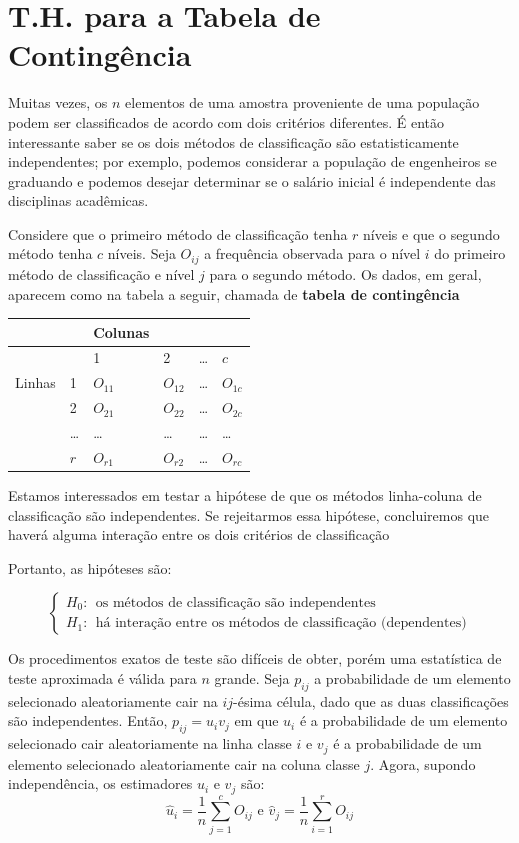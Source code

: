 \documentclass[
]{book}
\begin{document}
\hypertarget{t.h.-para-a-tabela-de-continguxeancia}{%
\section{T.H. para a Tabela de Contingência}\label{t.h.-para-a-tabela-de-continguxeancia}}

Muitas vezes, os \(n\) elementos de uma amostra proveniente de uma população podem ser classificados de acordo com dois critérios diferentes. É então interessante saber se os dois métodos de classificação são estatisticamente independentes; por exemplo, podemos considerar a população de engenheiros se graduando e podemos desejar determinar se o salário inicial é independente das disciplinas acadêmicas.

Considere que o primeiro método de classificação tenha \(r\) níveis e que o segundo método tenha \(c\) níveis. Seja \(O_{ij}\) a frequência observada para o nível \(i\) do primeiro método de classificação e nível \(j\) para o segundo método. Os dados, em geral, aparecem como na tabela a seguir, chamada de \textbf{tabela de contingência}

\begin{longtable}[]{@{}llllll@{}}
\toprule
& & Colunas & & & \\
\midrule
\endhead
& & 1 & 2 & \ldots{} & \(c\) \\
Linhas & 1 & \(O_{11}\) & \(O_{12}\) & \ldots{} & \(O_{1c}\) \\
& 2 & \(O_{21}\) & \(O_{22}\) & \ldots{} & \(O_{2c}\) \\
& \ldots{} & \ldots{} & \ldots{} & \ldots{} & \ldots{} \\
& \(r\) & \(O_{r1}\) & \(O_{r2}\) & \ldots{} & \(O_{rc}\) \\
\bottomrule
\end{longtable}

Estamos interessados em testar a hipótese de que os métodos linha-coluna de classificação são independentes. Se rejeitarmos essa hipótese, concluiremos que haverá alguma interação entre os dois critérios de classificação

Portanto, as hipóteses são:

\[
\begin{cases}
H_0:~~\text{os métodos de classificação são independentes}\\
H_1:~~\text{há interação entre os métodos de classificação (dependentes)}
\end{cases}
\]

Os procedimentos exatos de teste são difíceis de obter, porém uma estatística de teste aproximada é válida para \(n\) grande. Seja \(p_{ij}\) a probabilidade de um elemento selecionado aleatoriamente cair na \(ij\)-ésima célula, dado que as duas classificações são independentes. Então, \(p_{ij}=u_{i}v_{j}\) em que \(u_{i}\) é a probabilidade de um elemento selecionado cair aleatoriamente na linha classe \(i\) e \(v_j\) é a probabilidade de um elemento selecionado aleatoriamente cair na coluna classe \(j\). Agora, supondo independência, os estimadores \(u_i\) e \(v_j\) são:
\[\hat u_i=\frac{1}{n}\sum_{j=1}^cO_{ij} \text{ e } \hat v_j=\frac{1}{n}\sum_{i=1}^rO_{ij}\]
\end{document}
